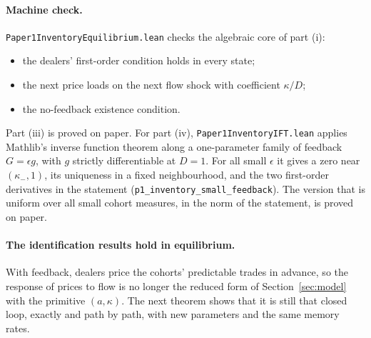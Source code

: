 \paragraph{Machine check.} \nolinkurl{Paper1InventoryEquilibrium.lean} checks the algebraic core of part (i):
\begin{itemize}[itemsep=1pt,topsep=2pt]
\item the dealers' first-order condition holds in every state;
\item the next price loads on the next flow shock with coefficient $\kappa/D$;
\item the no-feedback existence condition.
\end{itemize}
Part (iii) is proved on paper. For part (iv), \nolinkurl{Paper1InventoryIFT.lean} applies Mathlib's inverse function theorem along a one-parameter family of feedback $G=\epsilon g$, with $g$ strictly differentiable at $D=1$. For all small $\epsilon$ it gives a zero near $(\kappa_-,1)$, its uniqueness in a fixed neighbourhood, and the two first-order derivatives in the statement (\nolinkurl{p1_inventory_small_feedback}). The version that is uniform over all small cohort measures, in the norm of the statement, is proved on paper.

\paragraph{The identification results hold in equilibrium.} With feedback, dealers price the cohorts' predictable trades in advance, so the response of prices to flow is no longer the reduced form of Section~\ref{sec:model} with the primitive $(a,\kappa)$. The next theorem shows that it is still that closed loop, exactly and path by path, with new parameters and the same memory rates.

